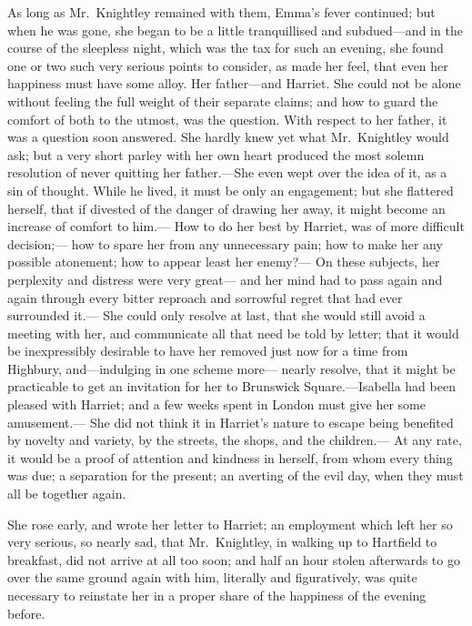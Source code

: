 As long as Mr.\ Knightley remained with them, Emma's fever continued;
but when he was gone, she began to be a little tranquillised
and subdued---and in the course of the sleepless night, which was
the tax for such an evening, she found one or two such very serious
points to consider, as made her feel, that even her happiness
must have some alloy.  Her father---and Harriet.  She could not be
alone without feeling the full weight of their separate claims;
and how to guard the comfort of both to the utmost, was the question.
With respect to her father, it was a question soon answered.
She hardly knew yet what Mr.\ Knightley would ask; but a very short
parley with her own heart produced the most solemn resolution
of never quitting her father.---She even wept over the idea of it,
as a sin of thought.  While he lived, it must be only an engagement;
but she flattered herself, that if divested of the danger of
drawing her away, it might become an increase of comfort to him.---%
How to do her best by Harriet, was of more difficult decision;---%
how to spare her from any unnecessary pain; how to make
her any possible atonement; how to appear least her enemy?---%
On these subjects, her perplexity and distress were very great---%
and her mind had to pass again and again through every bitter
reproach and sorrowful regret that had ever surrounded it.---%
She could only resolve at last, that she would still avoid a
meeting with her, and communicate all that need be told by letter;
that it would be inexpressibly desirable to have her removed just
now for a time from Highbury, and---indulging in one scheme more---%
nearly resolve, that it might be practicable to get an invitation
for her to Brunswick Square.---Isabella had been pleased with Harriet;
and a few weeks spent in London must give her some amusement.---%
She did not think it in Harriet's nature to escape being benefited
by novelty and variety, by the streets, the shops, and the children.---%
At any rate, it would be a proof of attention and kindness in herself,
from whom every thing was due; a separation for the present; an averting
of the evil day, when they must all be together again.

She rose early, and wrote her letter to Harriet; an employment
which left her so very serious, so nearly sad, that Mr.\ Knightley,
in walking up to Hartfield to breakfast, did not arrive at all too soon;
and half an hour stolen afterwards to go over the same ground again
with him, literally and figuratively, was quite necessary to reinstate
her in a proper share of the happiness of the evening before.

